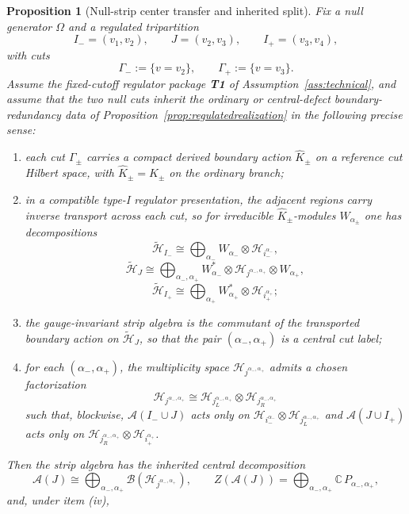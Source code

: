 \documentclass[11pt]{article}
\newtheorem{proposition}[theorem]{Proposition}
\begin{document}
\begin{proposition}[Null-strip center transfer and inherited split]\label{prop:nullec}
Fix a null generator \(\Omega\) and a regulated tripartition
\[
I_-=(v_1,v_2),\qquad
J=(v_2,v_3),\qquad
I_+=(v_3,v_4),
\]
with cuts
\[
\Gamma_-:=\{v=v_2\},
\qquad
\Gamma_+:=\{v=v_3\}.
\]
Assume the fixed-cutoff regulator package \textbf{T1} of Assumption~\ref{ass:technical}, and assume that the two null cuts inherit the ordinary or central-defect boundary-redundancy data of Proposition~\ref{prop:regulatedrealization} in the following precise sense:
\begin{enumerate}[leftmargin=2em,label=(\roman*)]
\item each cut \(\Gamma_\pm\) carries a compact derived boundary action \(\widehat K_\pm\) on a reference cut Hilbert space, with \(\widehat K_\pm=K_\pm\) on the ordinary branch;
\item in a compatible type-I regulator presentation, the adjacent regions carry inverse transport across each cut, so for irreducible \(\widehat K_\pm\)-modules \(W_{\alpha_\pm}\) one has decompositions
\[
\tilde{\mathcal H}_{I_-}
\cong
\bigoplus_{\alpha_-}
W_{\alpha_-}\otimes \mathcal H_{i_-^{\alpha_-}},
\]
\[
\tilde{\mathcal H}_{J}
\cong
\bigoplus_{\alpha_-,\alpha_+}
W_{\alpha_-}^{*}\otimes
\mathcal H_{j^{\alpha_-,\alpha_+}}\otimes
W_{\alpha_+},
\]
\[
\tilde{\mathcal H}_{I_+}
\cong
\bigoplus_{\alpha_+}
W_{\alpha_+}^{*}\otimes \mathcal H_{i_+^{\alpha_+}};
\]
\item the gauge-invariant strip algebra is the commutant of the transported boundary action on \(\tilde{\mathcal H}_J\), so that the pair \((\alpha_-,\alpha_+)\) is a central cut label;
\item for each \((\alpha_-,\alpha_+)\), the multiplicity space \(\mathcal H_{j^{\alpha_-,\alpha_+}}\) admits a chosen factorization
\[
\mathcal H_{j^{\alpha_-,\alpha_+}}
\cong
\mathcal H_{j_L^{\alpha_-,\alpha_+}}\otimes
\mathcal H_{j_R^{\alpha_-,\alpha_+}}
\]
such that, blockwise, \(\mathcal A(I_-\cup J)\) acts only on
\(\mathcal H_{i_-^{\alpha_-}}\otimes \mathcal H_{j_L^{\alpha_-,\alpha_+}}\)
and \(\mathcal A(J\cup I_+)\) acts only on
\(\mathcal H_{j_R^{\alpha_-,\alpha_+}}\otimes \mathcal H_{i_+^{\alpha_+}}\).
\end{enumerate}
Then the strip algebra has the inherited central decomposition
\[
\mathcal A(J)
\cong
\bigoplus_{\alpha_-,\alpha_+}
\mathcal B(\mathcal H_{j^{\alpha_-,\alpha_+}}),
\qquad
Z(\mathcal A(J))
=
\bigoplus_{\alpha_-,\alpha_+}\mathbb C\,P_{\alpha_-,\alpha_+},
\]
and, under item (iv),

\end{proposition}
\end{document}
